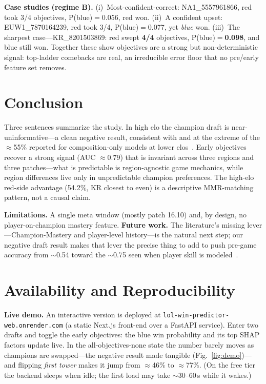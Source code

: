 \documentclass[sigconf,nonacm]{acmart}
\begin{document}
\textbf{Case studies (regime B).} (i)~Most-confident-correct: NA1\_5557961866, red
took 3/4 objectives, P(blue)$=$0.056, red won. (ii)~A confident upset:
EUW1\_7870164239, red took 3/4, P(blue)$=$0.077, yet \emph{blue} won. (iii)~The
sharpest case---KR\_8201503869: red swept \textbf{4/4} objectives,
P(blue)$=$\textbf{0.098}, and blue still won. Together these show objectives are a
strong but non-deterministic signal: top-ladder comebacks are real, an
irreducible error floor that no pre/early feature set removes.

\section{Conclusion}
Three sentences summarize the study. In high elo the champion draft is
near-uninformative---a clean negative result, consistent with and at the extreme
of the $\approx$55\% reported for composition-only models at lower elos~\cite{comp}.
Early objectives recover a strong signal (AUC $\approx 0.79$) that is invariant
across three regions and three patches---what is predictable is region-agnostic
game mechanics, while region differences live only in unpredictable champion
preferences. The high-elo red-side advantage (54.2\%, KR closest to even) is a
descriptive MMR-matching pattern, not a causal claim.

\textbf{Limitations.} A single meta window (mostly patch 16.10) and, by design, no
player-on-champion mastery feature. \textbf{Future work.} The literature's missing
lever---Champion-Mastery and player-level history---is the natural next step; our
negative draft result makes that lever the precise thing to add to push pre-game
accuracy from $\sim$0.54 toward the $\sim$0.75 seen when player skill is
modeled~\cite{do2021}.

\section{Availability and Reproducibility}
\textbf{Live demo.} An interactive version is deployed at
\texttt{lol-win-predictor-web.onrender.com} (a static Next.js front-end over a
FastAPI service). Enter two drafts and toggle the early objectives: the blue win
probability and its top SHAP factors update live. In the all-objectives-none
state the number barely moves as champions are swapped---the negative result made
tangible (Fig.~\ref{fig:demo})---and flipping \emph{first tower} makes it jump
from $\approx$46\% to $\approx$77\%. (On the free tier the backend sleeps when
idle; the first load may take $\sim$30--60\,s while it wakes.)
\end{document}
